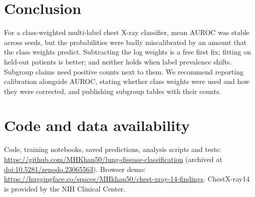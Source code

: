 \documentclass[11pt]{article}
\begin{document}
\section{Conclusion}

For a class-weighted multi-label chest X-ray classifier, mean AUROC was stable across seeds, but the probabilities were badly miscalibrated by an amount that the class weights predict. Subtracting the log weights is a free first fix; fitting on held-out patients is better; and neither holds when label prevalence shifts. Subgroup claims need positive counts next to them. We recommend reporting calibration alongside AUROC, stating whether class weights were used and how they were corrected, and publishing subgroup tables with their counts.

\section*{Code and data availability}
Code, training notebooks, saved predictions, analysis scripts and tests: \url{https://github.com/MHKhan50/lung-disease-classification} (archived at \href{https://doi.org/10.5281/zenodo.23065563}{doi:10.5281/zenodo.23065563}). Browser demo: \url{https://huggingface.co/spaces/MHkhan50/chest-xray-14-findings}. ChestX-ray14 is provided by the NIH Clinical Center.



\end{document}
